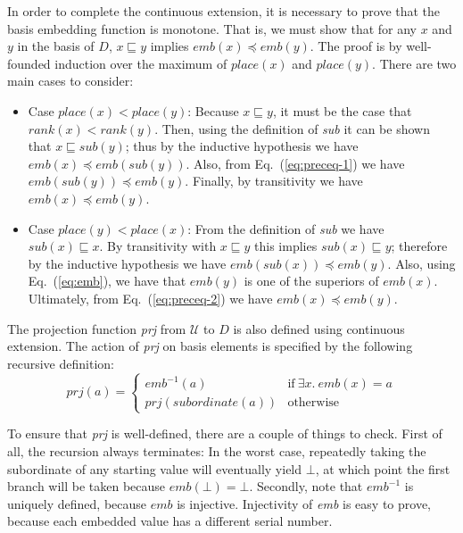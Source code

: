 In order to complete the continuous extension, it is necessary to prove that the basis embedding function is monotone. That is, we must show that for any $x$ and $y$ in the basis of $D$, $x \sqsubseteq y$ implies $\mathit{emb}(x) \preceq \mathit{emb}(y)$. The proof is by well-founded induction over the maximum of $\mathit{place}(x)$ and $\mathit{place}(y)$. There are two main cases to consider:
%
\begin{itemize}

\item Case $\mathit{place}(x) < \mathit{place}(y)$: Because $x \sqsubseteq y$, it must be the case that $\mathit{rank}(x) < \mathit{rank}(y)$. Then, using the definition of \emph{sub} it can be shown that $x \sqsubseteq \mathit{sub}(y)$; thus by the inductive hypothesis we have $\mathit{emb}(x) \preceq \mathit{emb}(\mathit{sub}(y))$. Also, from Eq.~(\ref{eq:preceq-1}) we have $\mathit{emb}(\mathit{sub}(y)) \preceq \mathit{emb}(y)$. Finally, by transitivity we have $\mathit{emb}(x) \preceq \mathit{emb}(y)$.

\item Case $\mathit{place}(y) < \mathit{place}(x)$: From the definition of \emph{sub} we have $\mathit{sub}(x) \sqsubseteq x$. By transitivity with $x \sqsubseteq y$ this implies $\mathit{sub}(x) \sqsubseteq y$; therefore by the inductive hypothesis we have $\mathit{emb}(\mathit{sub}(x)) \preceq \mathit{emb}(y)$. Also, using Eq.~(\ref{eq:emb}), we have that $\mathit{emb}(y)$ is one of the superiors of $\mathit{emb}(x)$. Ultimately, from Eq.~(\ref{eq:preceq-2}) we have $\mathit{emb}(x) \preceq \mathit{emb}(y)$.

\end{itemize}

The projection function \emph{prj} from $\mathcal{U}$ to $D$ is also defined using continuous extension. The action of \emph{prj} on basis elements is specified by the following recursive definition:
%
\begin{equation}
\mathit{prj}(a) =
\begin{cases}
\mathit{emb}^{-1}(a) & \mbox{if}~\exists x.~\mathit{emb}(x) = a \\
\mathit{prj}(\mathit{subordinate}(a)) & \mbox{otherwise}
\end{cases}
\label{eq:prj}
\end{equation}

To ensure that \emph{prj} is well-defined, there are a couple of things to check. First of all, the recursion always terminates: In the worst case, repeatedly taking the subordinate of any starting value will eventually yield $\bot$, at which point the first branch will be taken because $\mathit{emb}(\bot) = \bot$. Secondly, note that $\mathit{emb}^{-1}$ is uniquely defined, because $\mathit{emb}$ is injective. Injectivity of \emph{emb} is easy to prove, because each embedded value has a different serial number.

